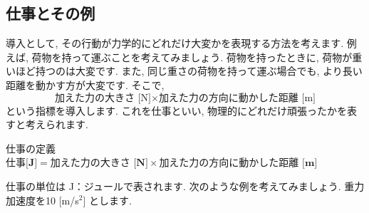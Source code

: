 \documentclass[11pt,dvipdfmx]{jsarticle}
\numberwithin{equation}{section} %
\begin{document}
\subsection{仕事とその例}
導入として, その行動が力学的にどれだけ大変かを表現する方法を考えます. 例えば, 荷物を持って運ぶことを考えてみましょう. 荷物を持ったときに, 荷物が重いほど持つのは大変です. また, 同じ重さの荷物を持って運ぶ場合でも, より長い距離を動かす方が大変です. そこで, 
\begin{equation}
    \text{加えた力の大きさ [N]}\times \text{加えた力の方向に動かした距離 [m]}
\end{equation}
という指標を導入します. これを仕事といい, 物理的にどれだけ頑張ったかを表すと考えられます. 
\begin{freebox}{仕事の定義}
    $\textbf{仕事[J]} = \textbf{加えた力の大きさ [N]}\times \textbf{加えた力の方向に動かした距離 [m]}$
\end{freebox}
仕事の単位は J：ジュールで表されます. 次のような例を考えてみましょう. 重力加速度を10 [m/s$^2$] とします. 
\end{document}
